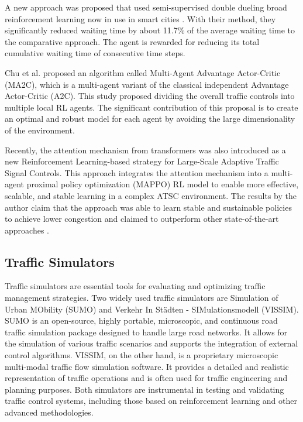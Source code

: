 A new approach was proposed that used semi-supervised double dueling broad reinforcement learning now in use in smart cities \cite{tang2020semi}. With their method, they significantly reduced waiting time by about 11.7\% of the average waiting time to the comparative approach. The agent is rewarded for reducing its total cumulative waiting time of consecutive time steps.

Chu et al. proposed an algorithm called Multi-Agent Advantage Actor-Critic (MA2C), which is a multi-agent variant of the classical independent Advantage Actor-Critic (A2C). This study proposed dividing the overall traffic controls into multiple local RL agents. The significant contribution of this proposal is to create an optimal and robust model for each agent by avoiding the large dimensionality of the environment. \cite{chu_multi-agent_2020}

Recently, the attention mechanism from transformers was also introduced as a new Reinforcement Learning-based strategy for Large-Scale Adaptive Traffic Signal Controls. This approach integrates the attention mechanism into a multi-agent proximal policy optimization (MAPPO) RL model to enable more effective, scalable, and stable learning in a complex ATSC environment. The results by the author claim that the approach was able to learn stable and sustainable policies to achieve lower congestion and claimed to outperform other state-of-the-art approaches \cite{han_attention_2024}.

\subsection{Traffic Simulators}
Traffic simulators are essential tools for evaluating and optimizing traffic management strategies. Two widely used traffic simulators are Simulation of Urban MObility (SUMO) and Verkehr In Städten - SIMulationsmodell (VISSIM). SUMO is an open-source, highly portable, microscopic, and continuous road traffic simulation package designed to handle large road networks. It allows for the simulation of various traffic scenarios and supports the integration of external control algorithms. VISSIM, on the other hand, is a proprietary microscopic multi-modal traffic flow simulation software. It provides a detailed and realistic representation of traffic operations and is often used for traffic engineering and planning purposes. Both simulators are instrumental in testing and validating traffic control systems, including those based on reinforcement learning and other advanced methodologies.
